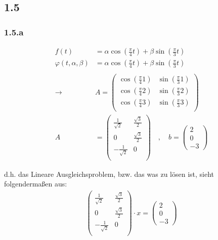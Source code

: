 \subsection*{1.5}
\subsubsection*{1.5.a}
\begin{equation}\begin{split}
	f(t) &= \alpha \cos\left(\frac{\pi}{4}t\right) + \beta \sin\left(\frac{\pi}{3}t\right) \\
	\varphi(t, \alpha, \beta) &= \alpha \cos\left(\frac{\pi}{4}t\right) + \beta \sin\left(\frac{\pi}{3}t\right)\\\\
	\rightarrow & 
	A = 
	\begin{pmatrix*}
		\cos\left(\frac{\pi}{4}1\right) & \sin\left(\frac{\pi}{3}1\right)\\
		\cos\left(\frac{\pi}{4}2\right) & \sin\left(\frac{\pi}{3}2\right)\\
		\cos\left(\frac{\pi}{4}3\right) & \sin\left(\frac{\pi}{3}3\right)\\		
	\end{pmatrix*}\\
	A &= 
	\begin{pmatrix*}
		\frac{1}{\sqrt{2}}  & \frac{\sqrt{3}}{2}\\
		0                   & \frac{\sqrt{3}}{2}\\
		-\frac{1}{\sqrt{2}} & 0\\		
	\end{pmatrix*}
	\quad, \quad
	b = 
	\begin{pmatrix*}
		2\\
		0\\
		-3
	\end{pmatrix*}
\end{split}\end{equation}

d.h. das Lineare Ausgleichsproblem, bzw. das was zu lösen ist, sieht folgendermaßen aus:
\begin{equation}\begin{split}
	\begin{pmatrix*}
		\frac{1}{\sqrt{2}}  & \frac{\sqrt{3}}{2}\\
		0                   & \frac{\sqrt{3}}{2}\\
		-\frac{1}{\sqrt{2}} & 0\\		
	\end{pmatrix*}
	\cdot x 
	= 
	\begin{pmatrix*}
		2\\
		0\\
		-3
	\end{pmatrix*}
\end{split}\end{equation}


